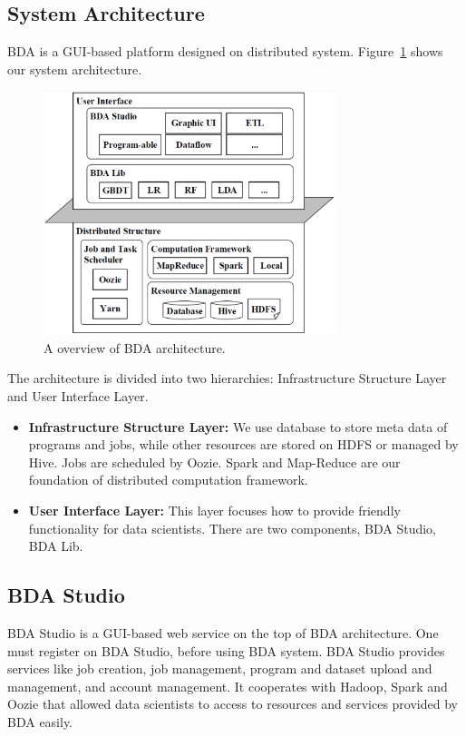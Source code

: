 \documentclass{sig-alternate-05-2015}
\begin{document}
\subsection{System Architecture}
BDA is a GUI-based platform designed on distributed system. Figure~\ref{fig:arch} shows our system architecture.

\begin{figure}[!htb]
\centering
\includegraphics[height=2.8in]{arch.eps}
\caption{ A overview of BDA architecture.}
\label{fig:arch}
\end{figure}

The architecture is divided into two hierarchies: Infrastructure Structure Layer and User Interface Layer.
\begin{itemize}
\item \textbf{Infrastructure Structure Layer:} We use database to store meta data of programs and jobs, while other resources are stored on HDFS or managed by Hive. Jobs are scheduled by Oozie. Spark and Map-Reduce are our foundation of distributed computation framework.
\item \textbf{User Interface Layer:} This layer focuses how to provide friendly functionality for data scientists. There are two components, BDA Studio, BDA Lib.
\end{itemize}


\subsection{BDA Studio}
BDA Studio is a GUI-based web service on the top of BDA architecture. One must register on BDA Studio, before using BDA system. BDA Studio provides services like job creation, job management, program and dataset upload and management, and account management. It cooperates with Hadoop, Spark and Oozie that allowed data scientists to access to resources and services provided by BDA easily.
\end{document}
